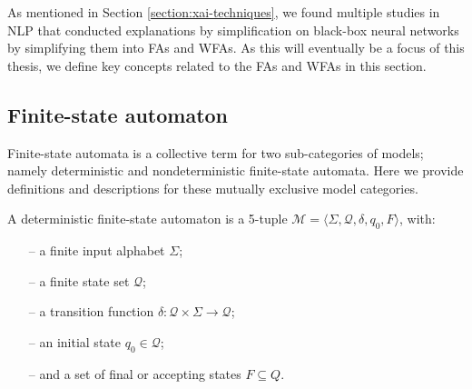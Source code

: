 As mentioned in Section \ref{section:xai-techniques}, we found multiple studies
in NLP that conducted explanations by simplification on black-box neural
networks by simplifying them into FAs and WFAs. As this will eventually be a
focus of this thesis, we define key concepts related to the FAs and WFAs in this
section.

\subsection{Finite-state automaton}

Finite-state automata is a collective term for two sub-categories of models;
namely deterministic and nondeterministic finite-state automata. Here we provide
definitions and descriptions for these mutually exclusive model categories.

\begin{definition}
  \label{def:fsa}
  A deterministic finite-state automaton is a 5-tuple $\mathcal{M} = \langle
  \Sigma, \mathcal{Q}, \delta, q_0, F \rangle$, with:
  \begin{itemize}
    \itemsep0em
    \item[--] a finite input alphabet $\Sigma$;
    \item[--] a finite state set $\mathcal{Q}$;
    \item[--] a transition function $\delta: \mathcal{Q} \times \Sigma
    \rightarrow \mathcal{Q}$;
    \item[--] an initial state $q_0 \in \mathcal{Q}$;
    \item[--] and a set of final or accepting states $F \subseteq Q$.
  \end{itemize}
\end{definition}


